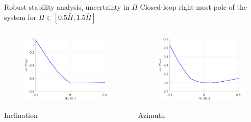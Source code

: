 \documentclass{beamer}
\begin{document}
\begin{frame}{Robust stability analysis, uncertainty in $\Pi$}
	Closed-loop right-most pole of the system for $\Pi \in [0.5\bar{\Pi},1.5\bar{\Pi}]$
		\begin{columns}[T]
			\hspace{0.5cm}\begin{column}{0.45\textwidth}
				\begin{figure}[ht]
					\includegraphics[width=1\textwidth]{images/RobustTestNominalInclination.pdf}
				\end{figure}
				\centering\LARGE Inclination
			\end{column}
			\hspace{0.5cm}\begin{column}{0.45\textwidth}
				\begin{figure}[ht]
					\includegraphics[width=1\textwidth]{images/RobustTestNominalAzimuth.pdf}
				\end{figure}	
			\centering	\LARGE Azimuth		
			\end{column}
		\end{columns}	
\end{frame}
\end{document}

